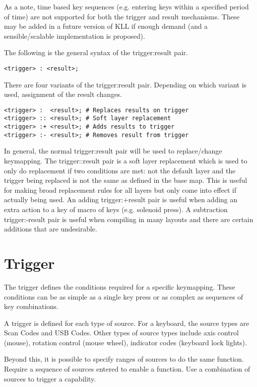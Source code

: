 \documentclass{kiibohd-template}
\begin{document}
As a note, time based key sequences (e.g. entering keys within a specified period of time) are not supported for both the trigger and result mechanisms.
These may be added in a future version of KLL if enough demand (and a sensible/scalable implementation is proposed).

The following is the general syntax of the trigger:result pair.

\begin{lstlisting}
<trigger> : <result>;
\end{lstlisting}

There are four variants of the trigger:result pair.
Depending on which variant is used, assignment of the result changes.

\begin{lstlisting}
<trigger> :  <result>; # Replaces results on trigger
<trigger> :: <result>; # Soft layer replacement
<trigger> :+ <result>; # Adds results to trigger
<trigger> :- <result>; # Removes result from trigger
\end{lstlisting}

In general, the normal trigger:result pair will be used to replace/change keymapping.
The trigger::result pair is a soft layer replacement which is used to only do replacement if two conditions are met: not the default layer and the trigger being replaced is not the same as defined in the base map.
This is useful for making broad replacement rules for all layers but only come into effect if actually being used.
An adding trigger:+result pair is useful when adding an extra action to a key of macro of keys (e.g. solenoid press).
A subtraction trigger:-result pair is useful when compiling in many layouts and there are certain additions that are undesirable.


\section{Trigger}

The trigger defines the conditions required for a specific keymapping.
These conditions can be as simple as a single key press or as complex as sequences of key combinations.

A trigger is defined for each type of source.
For a keyboard, the source types are Scan Codes and USB Codes.
Other types of source types include axis control (mouse), rotation control (mouse wheel), indicator codes (keyboard lock lights).

Beyond this, it is possible to specify ranges of sources to do the same function.
Require a sequence of sources entered to enable a function.
Use a combination of sources to trigger a capability.
\end{document}
